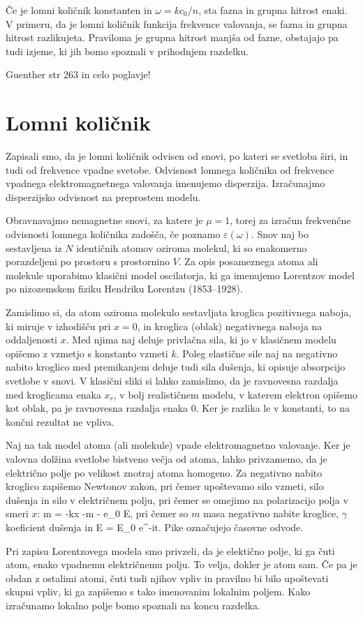 Če je lomni količnik konstanten in $\omega = k c_0/n$, sta fazna in grupna hitrost enaki.
V primeru, da je lomni količnik funkcija frekvence valovanja, se fazna in grupna hitrost
razlikujeta. Praviloma je grupna hitrost manjša od fazne, obstajajo pa tudi izjeme, ki
jih bomo spoznali v prihodnjem razdelku.




Guenther str 263 in celo poglavje!


\section{Lomni količnik}
Zapisali smo, da je lomni količnik odvisen od snovi, po kateri se svetloba širi, 
in tudi od frekvence vpadne svetobe. Odvisnost lomnega količnika od
frekvence vpadnega elektromagnetnega valovanja imenujemo disperzija. 
Izračunajmo disperzijsko odvisnost na preprostem modelu. 

Obravnavajmo nemagnetne snovi, za katere je $\mu = 1$, torej 
za izračun frekvenčne odvisnosti lomnega količnika zadošča, če 
poznamo $\varepsilon(\omega)$. Snov naj bo sestavljena iz $N$
identičnih atomov oziroma molekul, ki so enakomerno porazdeljeni
po prostoru s prostornino $V$. Za opis posameznega atoma ali molekule uporabimo 
klasični model oscilatorja, ki ga imenujemo Lorentzov model 
po nizozemskem fiziku Hendriku Lorentzu (1853--1928). 

Zamislimo si, da atom oziroma molekulo sestavljata kroglica 
pozitivnega naboja, ki miruje v izhodišču pri $x=0$, in kroglica
(oblak) negativnega naboja na oddaljenosti $x$. Med njima naj 
deluje privlačna sila, ki jo v klasičnem modelu opišemo z vzmetjo
s konstanto vzmeti $k$. 
Poleg elastične sile naj na negativno nabito kroglico med 
premikanjem deluje tudi sila dušenja, ki opisuje absorpcijo svetlobe
v snovi. V klasični sliki si lahko
zamislimo, da je ravnovesna razdalja med kroglicama enaka $x_r$, 
v bolj realističnem modelu, v katerem elektron opišemo kot oblak, 
pa je ravnovesna razdalja enaka 0. Ker je razlika le v konstanti, 
to na končni rezultat ne vpliva.

Naj na tak model atoma (ali molekule) vpade elektromagnetno valovanje. Ker je 
valovna dolžina svetlobe bistveno večja od atoma, lahko privzamemo, da
je električno polje po velikost znotraj atoma homogeno. Za negativno nabito
kroglico zapišemo Newtonov zakon, pri čemer upoštevamo silo vzmeti, silo 
dušenja in silo v električnem polju, pri čemer se omejimo na polarizacijo 
polja v smeri $x$:
\beq
m  = -kx -\gamma m  - e_0 E,
\label{eq:09_02}
\eeq
pri čemer so $m$ masa negativno nabite kroglice, $\gamma$ koeficient dušenja
in 
\beq
E = E_0 e^{-i\omega t}.
\label{eq:09_03}
\eeq
Pike označujejo časovne odvode.
\begin{remark}
Pri zapisu Lorentzovega modela smo privzeli, da je elektično polje, 
ki ga čuti atom, enako vpadnemu električnemu polju. 
To velja, dokler je atom sam. Če pa je obdan z ostalimi atomi, 
čuti tudi njihov vpliv in pravilno bi bilo upoštevati skupni vpliv, ki 
ga zapišemo s tako imenovanim lokalnim poljem. 
Kako izračunamo lokalno polje bomo spoznali na koncu razdelka. 
\end{remark}

